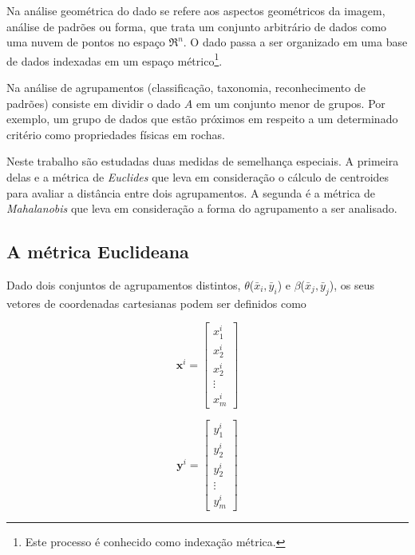 Na análise geométrica do dado se refere aos aspectos geométricos da imagem, análise de padrões ou forma, que trata um conjunto arbitrário de dados como uma nuvem de pontos no espaço  $\Re ^{n}$. O dado passa a ser organizado em uma base de dados indexadas em um espaço métrico\footnote{Este processo é conhecido como indexação métrica.}.

Na análise de agrupamentos (classificação, taxonomia, reconhecimento de padrões) consiste em dividir o dado $A$ em um conjunto menor de grupos. Por exemplo, um grupo de dados que estão próximos em respeito a um determinado critério como propriedades físicas em rochas. 

Neste trabalho são estudadas duas medidas de semelhança especiais. A primeira delas e a métrica de \textit{Euclides} que leva em consideração o cálculo de centroides para avaliar a distância entre dois agrupamentos. A segunda é a métrica de \textit{Mahalanobis} que leva em consideração a forma do agrupamento a ser analisado.   

\subsection{A métrica Euclideana}

Dado dois conjuntos de agrupamentos distintos, $\theta$($\bar{x}_{i},\bar{y}_{i}$) e $\beta$($\bar{x}_{j},\bar{y}_{j}$), os seus vetores de coordenadas cartesianas podem ser definidos como

\begin{multicols}{2}
	\begin{equation}
	 \textbf{x}^{i}=
		\begin{bmatrix} 
		x_{1}^{i} \\
		x_{2}^{i} \\
		x_{2}^{i} \\
		\vdots \\
		x_{m}^{i}
		\end{bmatrix}
	\end{equation}
	
   \begin{equation}
      \textbf{y}^{i}=
    	\begin{bmatrix} 
       	y_{1}^{i} \\
    	y_{2}^{i} \\
    	y_{2}^{i} \\
	     \vdots \\
	    y_{m}^{i}
    	\end{bmatrix}
   \end{equation}
\end{multicols}

